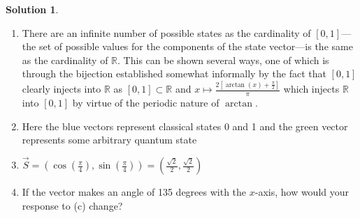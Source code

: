 \documentclass[10pt]{article}
\theoremstyle{definition}
\newtheorem{soln}{Solution}
\begin{document}
\begin{soln}~
  \begin{enumerate}[label=(\alph*)]
    \item There are an infinite number of possible states as the cardinality of $[0,1]$---the set of possible values for the components of the state vector---is the same as the cardinality of $\mathbb{R}$. This can be shown several ways,
          one of which is through the bijection established somewhat informally by the fact that $[0,1]$ clearly injects into $\mathbb{R}$ as $[0,1]\subset\mathbb{R}$
          and $x\mapsto \frac{2\left[\arctan(x)+\frac{\pi}{2}\right]}{\pi}$ which injects $\mathbb{R}$ into $[0,1]$ by virtue of the periodic nature of $\arctan$.
    \item Here the blue vectors represent classical states 0 and 1 and the green vector represents some arbitrary quantum state
          \begin{center}
          \end{center}
    \item $\displaystyle\vec{S}=\left(\cos\left(\frac{\pi}{4}\right),\sin\left(\frac{\pi}{4}\right)\right)=\left(\frac{\sqrt{2}}{2},\frac{\sqrt{2}}{2}\right)$
    \item If the vector makes an angle of 135 degrees with the $x$-axis, how would your response to (c) change?
  \end{enumerate}
\end{soln}
\end{document}
